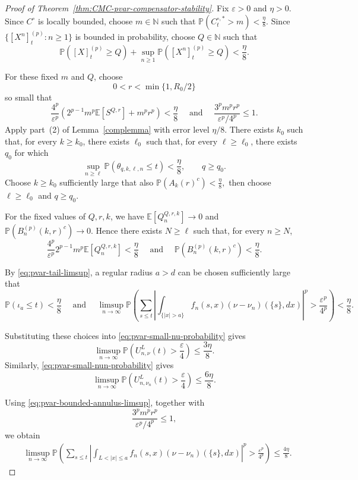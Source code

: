 \documentclass[a4paper,10pt]{article}
\newcommand{\E}{\mathbb E}
\renewcommand{\P}{\mathbb P}
\begin{document}
\begin{proof}[Proof of Theorem~\ref{thm:CMC-pvar-compensator-stability}]
Fix \(\varepsilon>0\) and \(\eta>0\). Since \(C^\circ\) is locally
bounded, choose \(m\in\mathbb N\) such that
$
        \P(C_t^{\circ,*}>m)<\frac{\eta}{8}.
$
Since
$
        \{[X^n]^{(p)}_t:n\ge1\}
$
is bounded in probability, choose \(Q\in\mathbb N\) such that
\[
\P([X]^{(p)}_t\ge Q)
+
\sup_{n\ge1}\P([X^n]^{(p)}_t\ge Q)
<
\frac{\eta}{8}.
\]

For these fixed \(m\) and \(Q\), choose
\[
        0<r<\min\{1,R_0/2\}
\]
so small that
\[
\frac{4^p}{\varepsilon^p}
\left(
2^{p-1}m^p\E[S^{Q,r}]
+
m^pr^p
\right)
<
\frac{\eta}{8} \quad\text{ and } \quad \frac{3^pm^pr^p}{\varepsilon^p/4^p}\le1.
\]
Apply part~(2) of Lemma~\ref{complemma} with
error level \(\eta/8\). There exists \(k_0\) such that, for every
\(k\ge k_0\), there exists \(\ell_0\) such that, for every
\(\ell\ge\ell_0\), there exists \(q_0\) for which
\[
        \sup_{n\ge\ell}
        \P(\theta_{q,k,\ell,n}\le t)
        <
        \frac{\eta}{8},
        \qquad q\ge q_0.
\]
Choose \(k\ge k_0\) sufficiently large that also
$
        \P(A_k(r)^c)<\frac{\eta}{8},
$
then choose \(\ell\ge\ell_0\) and \(q\ge q_0\).

For the fixed values of \(Q,r,k\), we have
$
        \E[Q_n^{Q,r,k}]\longrightarrow0
$
and
$
        \P(B_n^{(p)}(k,r)^c)\longrightarrow0.
$
Hence there exists \(N\ge\ell\) such that, for every \(n\ge N\),
\[
\frac{4^p}{\varepsilon^p}
2^{p-1}m^p\E[Q_n^{Q,r,k}]
<
\frac{\eta}{8}
\quad\text{ and } \quad  \P(B_n^{(p)}(k,r)^c)<\frac{\eta}{8}.
\]

By \eqref{eq:pvar-tail-limsup}, a regular radius \(a>d\) can be
chosen sufficiently large that
\[
        \P(\iota_a\le t)<\frac{\eta}{8}
        \quad\text{ and } \quad \limsup_{n\to\infty}
\P\left(
\sum_{s\le t}
\left|
\int_{\{|x|>a\}}
f_n(s,x)(\nu-\nu_n)(\{s\},dx)
\right|^p
>
\frac{\varepsilon^p}{4^p}
\right)
<
\frac{\eta}{8}.
\]

Substituting these choices into
\eqref{eq:pvar-small-nu-probability} gives
\[
\limsup_{n\to\infty}
\P\left(
U_{n,\nu}^{L}(t)>\frac{\varepsilon}{4}
\right)
\le
\frac{3\eta}{8}.
\]
Similarly, \eqref{eq:pvar-small-nun-probability} gives
\[
\limsup_{n\to\infty}
\P\left(
U_{n,\nu_n}^{L}(t)>\frac{\varepsilon}{4}
\right)
\le
\frac{6\eta}{8}.
\]

Using \eqref{eq:pvar-bounded-annulus-limsup}, together with
\[
        \frac{3^pm^pr^p}{\varepsilon^p/4^p}\le1,
\]
we obtain
\[
\begin{aligned}
&\limsup_{n\to\infty}
\P\left(
\sum_{s\le t}
\left|
\int_{L<|x|\le a}
f_n(s,x)(\nu-\nu_n)(\{s\},dx)
\right|^p
>
\frac{\varepsilon^p}{4^p}
\right)
\le
\frac{4\eta}{8}.
\end{aligned}
\]


\end{proof}
\end{document}
